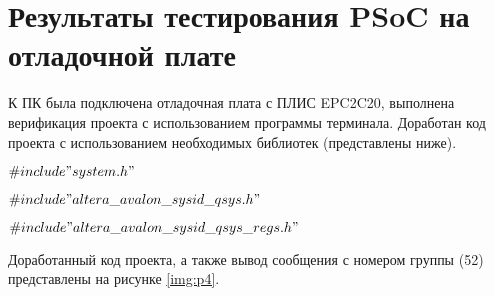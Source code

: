 \section*{Результаты тестирования PSoC на отладочной плате}

К ПК была подключена отладочная плата с ПЛИС EPC2C20, выполнена верификация проекта с использованием программы терминала. Доработан код проекта с использованием необходимых библиотек (представлены ниже).

 $\#include "system.h"$
 
 $\#include "altera\_avalon\_sysid\_qsys.h"$
 
 $\#include "altera\_avalon\_sysid\_qsys\_regs.h"$
 
 
Доработанный код проекта, а также вывод сообщения с номером группы (52) представлены на рисунке \ref{img:p4}.

\clearpage